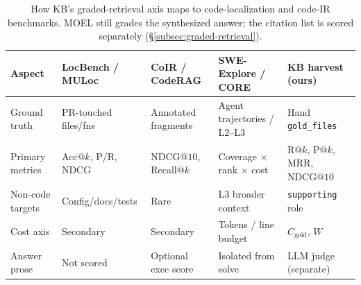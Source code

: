 \begin{table}[t]
\centering
\caption{How KB's graded-retrieval axis maps to code-localization and code-IR benchmarks.
MOEL still grades the synthesized answer; the citation list is scored separately
(\S\ref{subsec:graded-retrieval}).}
\label{tab:localization-alignment}
\small
\begin{tabular}{p{2.4cm}p{2.6cm}p{2.6cm}p{2.6cm}p{2.8cm}}
\toprule
\textbf{Aspect} & \textbf{LocBench / MULoc} & \textbf{CoIR / CodeRAG} & \textbf{SWE-Explore / CORE} & \textbf{KB harvest (ours)} \\
\midrule
Ground truth & PR-touched files/fns & Annotated fragments & Agent trajectories / L2--L3 & Hand \texttt{gold\_files} \\
Primary metrics & Acc@$k$, P/R, NDCG & NDCG@$10$, Recall@$k$ & Coverage $\times$ rank $\times$ cost & R@$k$, P@$k$, MRR, NDCG@$10$ \\
Non-code targets & Config/docs/tests & Rare & L3 broader context & \texttt{supporting} role \\
Cost axis & Secondary & Secondary & Tokens / line budget & $C_{\text{gold}}$, $W$ \\
Answer prose & Not scored & Optional exec score & Isolated from solve & LLM judge (separate) \\
\bottomrule
\end{tabular}
\end{table}
